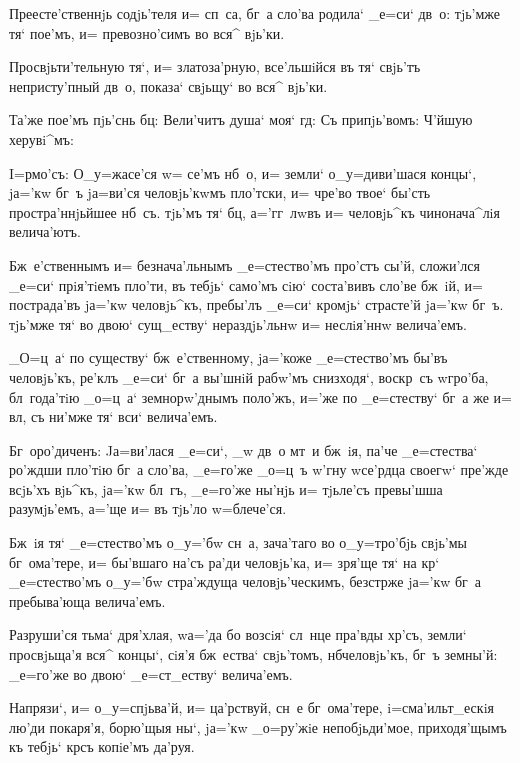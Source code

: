 Преесте'ственнjь содjь'теля и= сп~са, бг~а сло'ва 
родила` _е=си` дв~о: тjь'мже тя` пое'мъ, и= превозно'симъ 
во вся^ вjь'ки.

Просвjьти'тельную тя`, и= златоза'рную, все'льшiйся въ 
тя` свjь'тъ непристу'пный дв~о, показа` свjьщу` во вся^ 
вjь'ки.

Та'же пое'мъ пjь'снь бц: Вели'читъ душа` моя` 
гд: Съ припjь'вомъ: Ч'йшую херувi^мъ:


I=рмо'съ: О_у=жасе'ся w= се'мъ нб~о, и= земли` 
о_у=диви'шася концы`, jа='кw бг~ъ jа=ви'ся человjь'кwмъ 
пло'тски, и= чре'во твое` бы'сть простра'ннjьйшее нб~съ. 
тjь'мъ тя` бц, а='гг~лwвъ и= человjь^къ чинонача^лiя 
велича'ютъ.

Бж~е'ственнымъ и= безнача'льнымъ _е=стество'мъ про'стъ 
сы'й, сложи'лся _е=си` прiя'тiемъ пло'ти, въ тебjь` 
само'мъ сiю` соста'вивъ сло'ве бж~iй, и= пострада'въ 
jа='кw человjь^къ, пребы'лъ _е=си` кромjь` страсте'й 
jа='кw бг~ъ. тjь'мже тя` во двою` сущ_еству` 
нераздjь'льнw и= неслiя'ннw велича'емъ.

_О=ц~а` по существу` бж~е'ственному, jа='коже 
_е=стество'мъ бы'въ человjь'къ, ре'клъ _е=си` бг~а 
вы'шнiй рабw'мъ снизходя`, воскр~съ w\т гро'ба, 
бл~года'тiю _о=ц~а` земнорw'днымъ поло'жъ, и='же по 
_е=стеству` бг~а же и= вл, съ ни'мже тя` вси` 
велича'емъ.

Бг~оро'диченъ: Jа=ви'лася _е=си`, _w дв~о мт~и бж~iя, 
па'че _е=стества` ро'ждши пло'тiю бг~а сло'ва, _е=го'же 
_о=ц~ъ w'гну w\т се'рдца своегw` пре'жде всjь'хъ 
вjь^къ, jа='кw бл~гъ, _е=го'же ны'нjь и= тjьле'съ 
превы'шша разумjь'емъ, а='ще и= въ тjь'ло w=блече'ся.


Бж~iя тя` _е=стество'мъ о_у='бw сн~а, зача'таго во 
о_у=тро'бjь свjь'мы бг~ома'тере, и= бы'вшаго на'съ ра'ди 
человjь'ка, и= зря'ще тя` на кр` _е=стество'мъ 
о_у='бw стра'ждуща человjь'ческимъ, безстр же jа='кw 
бг~а пребыва'юща велича'емъ.

Разруши'ся тьма` дря'хлая, w\т а='да бо возсiя` сл~нце 
пра'вды хр'съ, земли` просвjьща'я вся^ концы`, сiя'я 
бж~ества` свjь'томъ, нб человjь'къ, бг~ъ земны'й: 
_е=го'же во двою` _е=ст_еству` велича'емъ.

Напрязи`, и= о_у=спjьва'й, и= ца'рствуй, сн~е 
бг~ома'тере, i=сма'ильт_ескiя лю'ди покаря'я, борю'щыя 
ны`, jа='кw _о=ру'жiе непобjьди'мое, приходя'щымъ къ 
тебjь` кр съ копiе'мъ да'руя.


